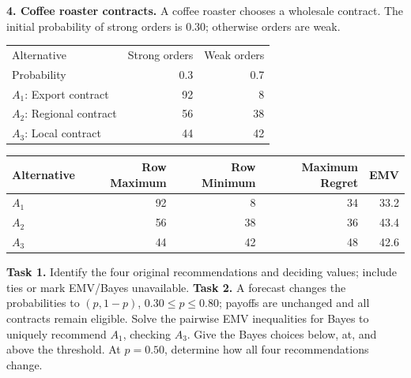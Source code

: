 \begin{studentproblem}
\textbf{4. Coffee roaster contracts.} A coffee roaster chooses a wholesale contract. The initial probability of strong orders is 0.30; otherwise orders are weak.
\begin{center}\begin{tabular}{lrr}\toprule Alternative & Strong orders & Weak orders\\
Probability & 0.3 & 0.7\\
\midrule
$A_1$: Export contract & 92 & 8\\
$A_2$: Regional contract & 56 & 38\\
$A_3$: Local contract & 44 & 42\\
\bottomrule\end{tabular}\end{center}
\begin{center}\begin{tabular}{lrrrr}\toprule Alternative & Row Maximum & Row Minimum & Maximum Regret & EMV\\\midrule
$A_1$ & 92 & 8 & 34 & 33.2\\
$A_2$ & 56 & 38 & 36 & 43.4\\
$A_3$ & 44 & 42 & 48 & 42.6\\
\bottomrule\end{tabular}\end{center}
\textbf{Task 1.} Identify the four original recommendations and deciding values; include ties or mark EMV/Bayes unavailable.
\choices
\textbf{Task 2.} A forecast changes the probabilities to $(p,1-p)$, $0.30\leq p\leq0.80$; payoffs are unchanged and all contracts remain eligible. Solve the pairwise EMV inequalities for Bayes to uniquely recommend $A_1$, checking $A_3$. Give the Bayes choices below, at, and above the threshold. At $p=0.50$, determine how all four recommendations change.
\tasktwobox
\end{studentproblem}

